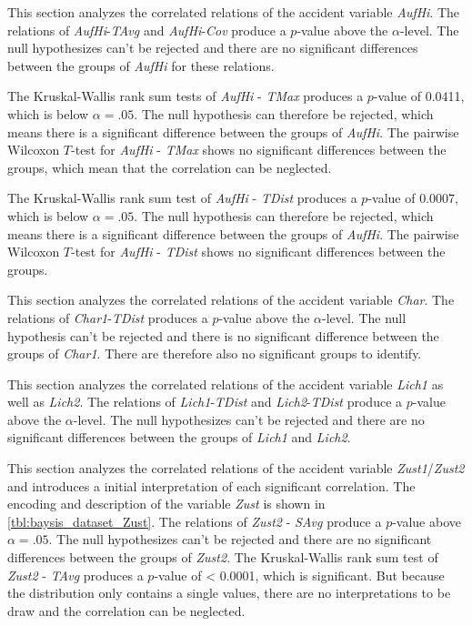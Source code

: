 This section analyzes the correlated relations of the accident variable \textit{AufHi}. The relations of \textit{AufHi}-\textit{TAvg} and \textit{AufHi}-\textit{Cov} produce a $p$-value above the $\alpha$-level. The null hypothesizes can't be rejected and there are no significant differences between the groups of \textit{AufHi} for these relations.

The Kruskal-Wallis rank sum tests of \textit{AufHi} - \textit{TMax} produces a $p$-value of 0.0411, which is below $\alpha=.05$. The null hypothesis can therefore be rejected, which means there is a significant difference between the groups of \textit{AufHi}. The pairwise Wilcoxon $T$-test for \textit{AufHi} - \textit{TMax} shows no significant differences between the groups, which mean that the correlation can be neglected.

The Kruskal-Wallis rank sum test of \textit{AufHi} - \textit{TDist} produces a $p$-value of 0.0007, which is below $\alpha=.05$. The null hypothesis can therefore be rejected, which means there is a significant difference between the groups of \textit{AufHi}. The pairwise Wilcoxon $T$-test for \textit{AufHi} - \textit{TDist} shows no significant differences between the groups.

This section analyzes the correlated relations of the accident variable \textit{Char}. The relations of \textit{Char1}-\textit{TDist} produces a $p$-value above the $\alpha$-level. The null hypothesis can't be rejected and there is no significant difference between the groups of \textit{Char1}. There are therefore also no significant groups to identify.

This section analyzes the correlated relations of the accident variable \textit{Lich1} as well as \textit{Lich2}. The relations of \textit{Lich1}-\textit{TDist} and \textit{Lich2}-\textit{TDist} produce a $p$-value above the $\alpha$-level. The null hypothesizes can't be rejected and there are no significant differences between the groups of \textit{Lich1} and \textit{Lich2}.

This section analyzes the correlated relations of the accident variable \textit{Zust1}/\textit{Zust2} and introduces a initial interpretation of each significant correlation. The encoding and description of the variable \textit{Zust} is shown in \cref{tbl:baysis_dataset_Zust}. The relations of \textit{Zust2} - \textit{SAvg} produce a $p$-value above $\alpha=.05$. The null hypothesizes can't be rejected and there are no significant differences between the groups of \textit{Zust2}. The Kruskal-Wallis rank sum test of \textit{Zust2} - \textit{TAvg} produces a $p$-value of < 0.0001, which is significant. But because the distribution only contains a single values, there are no interpretations to be draw and the correlation can be neglected.

